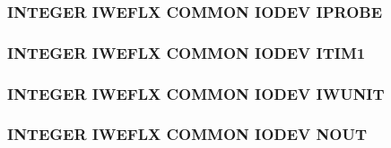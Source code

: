\hypertarget{io_8com_ac78fec03b038d9855f9e7bd52236485b}{
\subsubsection[{I\-P\-R\-O\-B\-E}]{\setlength{\rightskip}{0pt plus 5cm}I\-N\-T\-E\-G\-E\-R I\-W\-E\-F\-L\-X C\-O\-M\-M\-O\-N I\-O\-D\-E\-V I\-P\-R\-O\-B\-E}}\label{io_8com_ac78fec03b038d9855f9e7bd52236485b}
\hypertarget{io_8com_a27f7b0361aa0add307ec02f9f5e83ab9}{
\subsubsection[{I\-T\-I\-M1}]{\setlength{\rightskip}{0pt plus 5cm}I\-N\-T\-E\-G\-E\-R I\-W\-E\-F\-L\-X C\-O\-M\-M\-O\-N I\-O\-D\-E\-V I\-T\-I\-M1}}\label{io_8com_a27f7b0361aa0add307ec02f9f5e83ab9}
\hypertarget{io_8com_aa33f1e031443e69cd1ea5bc66aa1a655}{
\subsubsection[{I\-W\-U\-N\-I\-T}]{\setlength{\rightskip}{0pt plus 5cm}I\-N\-T\-E\-G\-E\-R I\-W\-E\-F\-L\-X C\-O\-M\-M\-O\-N I\-O\-D\-E\-V I\-W\-U\-N\-I\-T}}\label{io_8com_aa33f1e031443e69cd1ea5bc66aa1a655}
\hypertarget{io_8com_a2e833b9a395a744ecefcf46dd72e80f6}{
\subsubsection[{N\-O\-U\-T}]{\setlength{\rightskip}{0pt plus 5cm}I\-N\-T\-E\-G\-E\-R I\-W\-E\-F\-L\-X C\-O\-M\-M\-O\-N I\-O\-D\-E\-V N\-O\-U\-T}}\label{io_8com_a2e833b9a395a744ecefcf46dd72e80f6}
